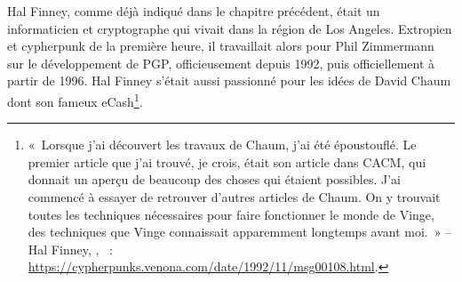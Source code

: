 Hal Finney, comme déjà indiqué dans le chapitre précédent, était un informaticien et cryptographe qui vivait dans la région de Los Angeles. Extropien et cypherpunk de la première heure, il travaillait alors pour Phil Zimmermann sur le développement de PGP, officieusement depuis 1992, puis officiellement à partir de 1996. Hal Finney s'était aussi passionné pour les idées de David Chaum dont son fameux eCash\footnote{«~Lorsque j'ai découvert les travaux de Chaum, j'ai été époustouflé. Le premier article que j'ai trouvé, je crois, était son article dans CACM, qui donnait un aperçu de beaucoup des choses qui étaient possibles. J'ai commencé à essayer de retrouver d'autres articles de Chaum. On y trouvait toutes les techniques nécessaires pour faire fonctionner le monde de Vinge, des techniques que Vinge connaissait apparemment longtemps avant moi.~» -- Hal Finney, , ~: \url{https://cypherpunks.venona.com/date/1992/11/msg00108.html}.}. %

